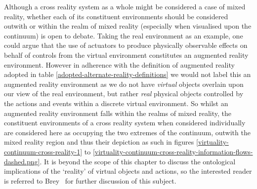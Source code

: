 


Although a cross reality system as a whole might be considered a case of mixed reality, whether each of its constituent environments should be considered outwith or within the realm of mixed reality (especially when visualised upon the continuum) is open to debate. Taking the real environment as an example, one could argue that the use of actuators to produce physically observable effects on behalf of controls from the virtual environment constitutes an augmented reality environment. However in adherence with the definition of augmented reality adopted in table \ref{adopted-alternate-reality-definitions} we would not label this an augmented reality environment as we do not have \textit{virtual} objects overlain upon our view of the real environment, but rather \textit{real} physical objects controlled by the actions and events within a discrete virtual environment. So whilst an augmented reality environment falls within the realms of mixed reality, the constituent environments of a cross reality system when considered individually are considered here as occupying the two extremes of the continuum, outwith the mixed reality region and thus their depiction as such in figures \ref{virtuality-continuum-cross-reality-1} to \ref{virtuality-continuum-cross-reality-information-flows-dashed.png}. It is beyond the scope of this chapter to discuss the ontological implications of the `reality' of virtual objects and actions, so the interested reader is referred to Brey~\cite{Brey2014} for further discussion of this subject.



